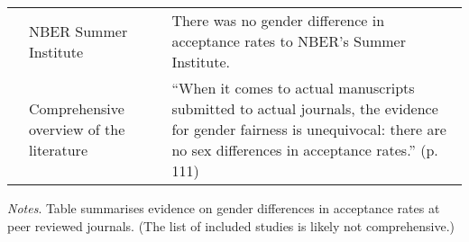 \begin{table}[H]
\begin{threeparttable}
\begin{tabular}{L{3cm}L{3cm}L{8cm}}
			\citet{Chari2017}&NBER Summer Institute&There was no gender difference in acceptance rates to NBER's Summer Institute.\\
			\citet{Ceci2014}&Comprehensive overview of the literature&``When it comes to actual manuscripts submitted to actual journals, the evidence for gender fairness is unequivocal: there are no sex differences in acceptance rates.'' (p. 111)\\
			\bottomrule
		\end{tabular}
		\begin{tablenotes}
			\item \textit{Notes}. Table summarises evidence on gender differences in acceptance rates at peer reviewed journals. (The list of included studies is likely not comprehensive.)
		\end{tablenotes}
	\end{threeparttable}
\end{table}